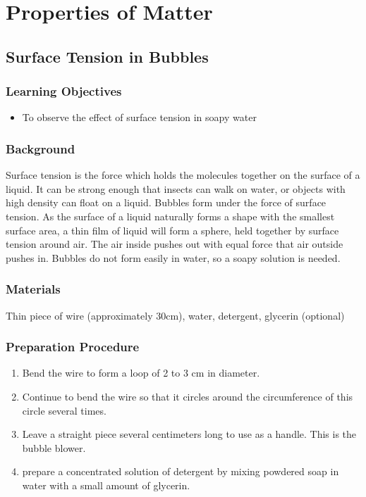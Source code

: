 \section{Properties of Matter}

\subsection{Surface Tension in Bubbles}

\subsubsection*{Learning Objectives}
\begin{itemize}
\item{To observe the effect of surface tension in soapy water}
\end{itemize}

\subsubsection*{Background}
Surface tension is the force which holds the molecules together on the surface of a liquid. It can be strong enough that insects can walk on water, or objects with high density can float on a liquid. Bubbles form under the force of surface tension. As the surface of a liquid naturally forms a shape with the smallest surface area, a thin film of liquid will form a sphere, held together by surface tension around air. The air inside pushes out with equal force that air outside pushes in. Bubbles do not form easily in water, so a soapy solution is needed.

\subsubsection*{Materials}
Thin piece of wire (approximately 30cm), water, detergent, glycerin (optional)

\subsubsection*{Preparation Procedure}
\begin{enumerate}
\item{Bend the wire to form a loop of 2 to 3 cm in diameter.}
\item{Continue to bend the wire so that it circles around the circumference of this circle several times.}
\item{Leave a straight piece several centimeters long to use as a handle. This is the bubble blower.}
\item{prepare a concentrated solution of detergent by mixing powdered soap in water with a small amount of glycerin.}
\end{enumerate}

